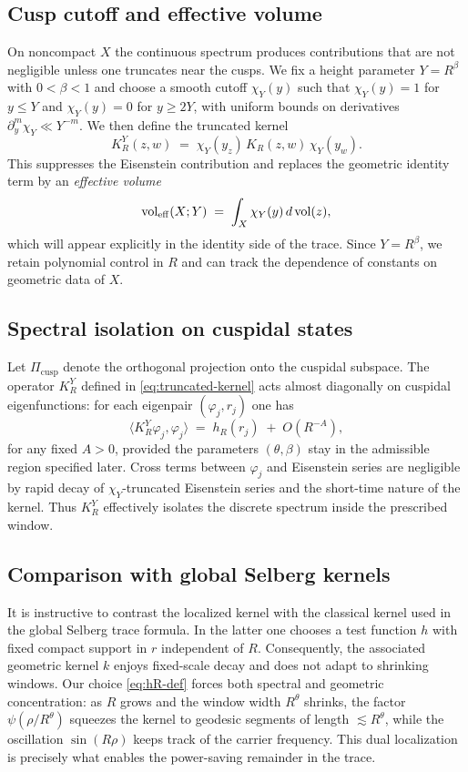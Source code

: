 \subsection{Cusp cutoff and effective volume}\label{subsec:cusp-cutoff}
On noncompact $X$ the continuous spectrum produces contributions that are not negligible unless one truncates near the cusps. We fix a height parameter $Y=R^\beta$ with $0<\beta<1$ and choose a smooth cutoff $\chi_Y(y)$ such that $\chi_Y(y)=1$ for $y\le Y$ and $\chi_Y(y)=0$ for $y\ge 2Y$, with uniform bounds on derivatives $\partial_y^m\chi_Y \ll Y^{-m}$. We then define the truncated kernel
\begin{equation}\label{eq:truncated-kernel}
K_R^Y(z,w) \;=\; \chi_Y(y_z)\, K_R(z,w)\, \chi_Y(y_w).
\end{equation}
This suppresses the Eisenstein contribution and replaces the geometric identity term by an \emph{effective volume}
\[
\operatorname{vol}_{\mathrm{eff}}(X;Y) \;=\; \int_X \chi_Y(y)\, d\operatorname{vol}(z),
\]
which will appear explicitly in the identity side of the trace. Since $Y=R^\beta$, we retain polynomial control in $R$ and can track the dependence of constants on geometric data of $X$.

\subsection{Spectral isolation on cuspidal states}\label{subsec:spectral-isolation}
Let $\Pi_{\mathrm{cusp}}$ denote the orthogonal projection onto the cuspidal subspace. The operator $K_R^Y$ defined in \eqref{eq:truncated-kernel} acts almost diagonally on cuspidal eigenfunctions: for each eigenpair $(\varphi_j,r_j)$ one has
\begin{equation}\label{eq:diagonal}
\langle K_R^Y \varphi_j,\varphi_j\rangle
\;=\; h_R(r_j)\;+\;O(R^{-\!A}),
\end{equation}
for any fixed $A>0$, provided the parameters $(\theta,\beta)$ stay in the admissible region specified later. Cross terms between $\varphi_j$ and Eisenstein series are negligible by rapid decay of $\chi_Y$-truncated Eisenstein series and the short-time nature of the kernel. Thus $K_R^Y$ effectively isolates the discrete spectrum inside the prescribed window.

\subsection{Comparison with global Selberg kernels}\label{subsec:comparison}
It is instructive to contrast the localized kernel with the classical kernel used in the global Selberg trace formula. In the latter one chooses a test function $h$ with fixed compact support in $r$ independent of $R$. Consequently, the associated geometric kernel $k$ enjoys fixed-scale decay and does not adapt to shrinking windows. Our choice \eqref{eq:hR-def} forces both spectral and geometric concentration: as $R$ grows and the window width $R^\theta$ shrinks, the factor $\psi(\rho/R^\theta)$ squeezes the kernel to geodesic segments of length $\lesssim R^\theta$, while the oscillation $\sin(R\rho)$ keeps track of the carrier frequency. This dual localization is precisely what enables the power-saving remainder in the trace.


